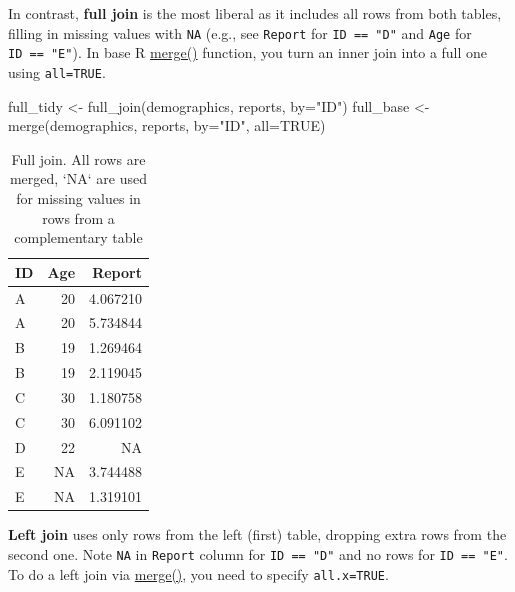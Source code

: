 \documentclass[
]{book}
\newenvironment{Shaded}{\begin{snugshade}}{\end{snugshade}}
\newcommand{\AttributeTok}[1]{\textcolor[rgb]{0.77,0.63,0.00}{#1}}
\newcommand{\ConstantTok}[1]{\textcolor[rgb]{0.00,0.00,0.00}{#1}}
\newcommand{\FunctionTok}[1]{\textcolor[rgb]{0.00,0.00,0.00}{#1}}
\newcommand{\NormalTok}[1]{#1}
\newcommand{\OtherTok}[1]{\textcolor[rgb]{0.56,0.35,0.01}{#1}}
\newcommand{\StringTok}[1]{\textcolor[rgb]{0.31,0.60,0.02}{#1}}
\begin{document}
In contrast, \textbf{full join} is the most liberal as it includes all rows from both tables, filling in missing values with \texttt{NA} (e.g., see \texttt{Report} for \texttt{ID\ ==\ "D"} and \texttt{Age} for \texttt{ID\ ==\ "E"}). In base R \href{https://stat.ethz.ch/R-manual/R-devel/library/base/html/merge.html}{merge()} function, you turn an inner join into a full one using \texttt{all=TRUE}.

\begin{Shaded}
\begin{Highlighting}[]
\NormalTok{full\_tidy }\OtherTok{\textless{}{-}} \FunctionTok{full\_join}\NormalTok{(demographics, reports, }\AttributeTok{by=}\StringTok{"ID"}\NormalTok{) }
\NormalTok{full\_base }\OtherTok{\textless{}{-}} \FunctionTok{merge}\NormalTok{(demographics, reports, }\AttributeTok{by=}\StringTok{"ID"}\NormalTok{, }\AttributeTok{all=}\ConstantTok{TRUE}\NormalTok{)}
\end{Highlighting}
\end{Shaded}

\begin{table}

\caption{\label{tab:unnamed-chunk-183}Full join. All rows are merged, `NA` are used for missing values in rows from a complementary table}
\centering
\begin{tabular}[t]{l|r|r}
\hline
ID & Age & Report\\
\hline
A & 20 & 4.067210\\
\hline
A & 20 & 5.734844\\
\hline
B & 19 & 1.269464\\
\hline
B & 19 & 2.119045\\
\hline
C & 30 & 1.180758\\
\hline
C & 30 & 6.091102\\
\hline
D & 22 & NA\\
\hline
E & NA & 3.744488\\
\hline
E & NA & 1.319101\\
\hline
\end{tabular}
\end{table}

\textbf{Left join} uses only rows from the left (first) table, dropping extra rows from the second one. Note \texttt{NA} in \texttt{Report} column for \texttt{ID\ ==\ "D"} and no rows for \texttt{ID\ ==\ "E"}. To do a left join via \href{https://stat.ethz.ch/R-manual/R-devel/library/base/html/merge.html}{merge()}, you need to specify \texttt{all.x=TRUE}.
\end{document}
